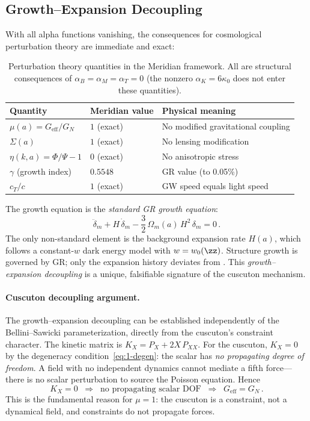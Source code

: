 \subsection{Growth--Expansion Decoupling}
\label{sec:1-growth-decoupling}

With all alpha functions vanishing, the consequences for cosmological perturbation theory are immediate and exact:

\begin{table}[h]
\centering
\caption{Perturbation theory quantities in the Meridian framework. All are structural consequences of $\alpha_B = \alpha_M = \alpha_T = 0$ (the nonzero $\alpha_K = 6\kappa_0$ does not enter these quantities).}
\label{tab:1-perturbation-summary}
\begin{tabular}{@{}lll@{}}
\toprule
Quantity & Meridian value & Physical meaning \\
\midrule
$\mu(a) = G_{\mathrm{eff}}/G_N$ & $1$ (exact) & No modified gravitational coupling \\
$\Sigma(a)$ & $1$ (exact) & No lensing modification \\
$\eta(k,a) = \Phi/\Psi - 1$ & $0$ (exact) & No anisotropic stress \\
$\gamma$ (growth index) & $0.5548$ & GR value (to 0.05\%) \\
$c_T/c$ & $1$ (exact) & GW speed equals light speed \\
\bottomrule
\end{tabular}
\end{table}

\noindent The growth equation is the \emph{standard GR growth equation}:
\begin{equation}
\label{eq:1-growth-eq}
\ddot{\delta}_m + H\,\dot{\delta}_m - \frac{3}{2}\,\Omega_m(a)\,H^2\,\delta_m = 0\,.
\end{equation}
The only non-standard element is the background expansion rate $H(a)$, which follows a constant-$w$ dark energy model with $w = w_0(\zz)$. Structure growth is governed by GR; only the expansion history deviates from \LCDM. This \emph{growth--expansion decoupling} is a unique, falsifiable signature of the cuscuton mechanism.

\paragraph{Cuscuton decoupling argument.} The growth--expansion decoupling can be established independently of the Bellini--Sawicki parameterization, directly from the cuscuton's constraint character. The kinetic matrix is $K_X = P_X + 2X\,P_{XX}$. For the cuscuton, $K_X = 0$ by the degeneracy condition~\eqref{eq:1-degen}: the scalar has \emph{no propagating degree of freedom}. A field with no independent dynamics cannot mediate a fifth force---there is no scalar perturbation to source the Poisson equation. Hence
\begin{equation}
\label{eq:1-cuscuton-decoupling}
K_X = 0 \;\;\Longrightarrow\;\; \text{no propagating scalar DOF} \;\;\Longrightarrow\;\; G_{\mathrm{eff}} = G_N\,.
\end{equation}
This is the fundamental reason for $\mu = 1$: the cuscuton is a constraint, not a dynamical field, and constraints do not propagate forces.

